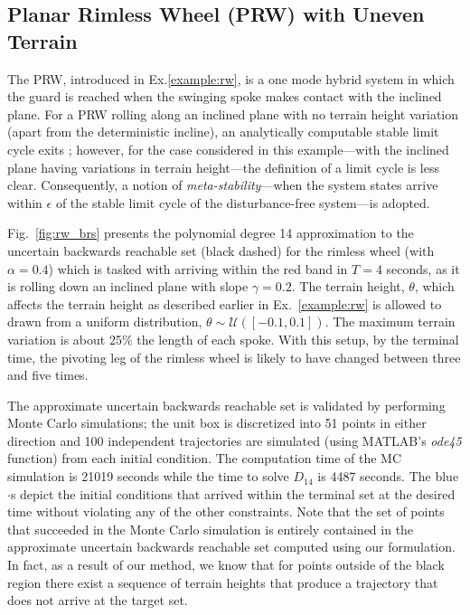 \subsection{Planar Rimless Wheel (PRW) with Uneven Terrain}
The PRW, introduced in Ex.\ref{example:rw}, is a one mode hybrid system in which the guard is reached when the swinging spoke makes contact with the inclined plane.
For a PRW rolling along an inclined plane with no terrain height variation (apart from the deterministic incline), an analytically computable stable limit cycle exits \cite{Coleman1998}; however, for the case considered in this example---with the inclined plane having variations in terrain height---the definition of a limit cycle is less clear.
Consequently, a notion of {\em meta-stability}---when the system states arrive within $\epsilon$ of the stable limit cycle of the disturbance-free system---is adopted.
\par
Fig.~\ref{fig:rw_brs} presents the polynomial degree 14 approximation to the uncertain backwards reachable set (black dashed) for the rimless wheel (with $\alpha=0.4$) which is tasked with arriving within the red band in $T=4$ seconds, as it is rolling down an inclined plane with slope $\gamma=0.2$. The terrain height, $\theta$, which affects the terrain height as described earlier in Ex.~\ref{example:rw} is allowed to drawn from a uniform distribution, $\theta\sim\mathcal U([-0.1,0.1])$. The maximum terrain variation is about 25\% the length of each spoke. With this setup, by the terminal time, the pivoting leg of the rimless wheel is likely to have changed between three and five times.
\par
The approximate uncertain backwards reachable set is validated by performing Monte Carlo simulations; the unit box is discretized into 51 points in either direction and 100 independent trajectories are simulated (using MATLAB's {\em ode45} function) from each initial condition. The computation time of the MC simulation is 21019 seconds while the time to solve $D_{14}$ is 4487 seconds.
The blue $\cdot$s depict the initial conditions that arrived within the terminal set at the desired time without violating any of the other constraints. Note that the set of points that succeeded in the Monte Carlo simulation is entirely contained in the approximate uncertain backwards reachable set computed using our formulation. In fact, as a result of our method, we know that for points outside of the black region there exist a sequence of terrain heights that produce a trajectory that does not arrive at the target set.
